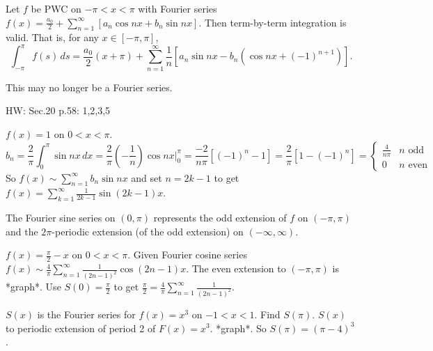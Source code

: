 \documentclass[]{article}
\begin{document}

\begin{theorem}
	Let $f$ be PWC on $-\pi<x<\pi$ with Fourier series $f(x) = \frac{a_0}{2} + \sum_{n=1}^\infty [ a_n\cos{nx} + b_n\sin{nx}]$. Then term-by-term integration is valid. That is, for any $x\in[-\pi,\pi]$, $$\int_{-\pi}^\pi f(s) \, ds = \frac{a_0}{2}(x+\pi) + \sum_{n=1}^\infty \frac{1}{n}\left[ a_n\sin{nx} - b_n\left(\cos{nx} +(-1)^{n+1} \right)\right]. $$
	\begin{note}
		This may no longer be a Fourier series.
	\end{note}
\end{theorem}
HW: Sec.20 p.58: 1,2,3,5
\begin{example}
	$f(x) = 1$ on $0<x<\pi$. $$b_n = \frac{2}{\pi}\int_0^\pi\sin{nx}\, dx = \frac{2}{\pi} \left( -\frac{1}{n} \right) \cos{nx} \bigg\rvert_0^\pi = \frac{-2}{n\pi} \left[ (-1)^n-1 \right] = \frac{2}{\pi} [1-(-1)^n] = \begin{cases} \frac{4}{n\pi} & n \text{ odd} \\ 0 & n \text{ even} \end{cases}$$ So $f(x) \sim \sum_{n=1}^\infty b_n \sin{nx} $ and set $n=2k-1$ to get $f(x) = \sum_{k=1}^\infty \frac{1}{2k-1}\sin{(2k-1)x}$.

	The Fourier sine series on $(0,\pi)$ represents the odd extension of $f$ on $(-\pi,\pi)$ and the $2\pi$-periodic extension (of the odd extension) on $(-\infty,\infty)$.
\end{example}

\begin{example}
	 $f(x) = \frac{\pi}{2} - x$ on $0<x<\pi$. Given Fourier cosine series $f(x) \sim \frac{4}{\pi} \sum_{n=1}^\infty \frac{1}{(2n-1)^2} \cos{(2n-1)x}$. The even extension to $(-\pi,\pi)$ is *graph*.
	Use $S(0)=\frac{\pi}{2}$ to get $\frac{\pi}{2} = \frac{4}{\pi} \sum_{n=1}^\infty \frac{1}{(2n-1)^2}$.
\end{example}
\begin{example}
	 $S(x)$ is the Fourier series for $f(x) = x^3$ on $-1<x<1$. Find $S(\pi)$. $S(x)$  to periodic extension of period 2 of $F(x) = x^3$. *graph*. So $S(\pi) = (\pi-4)^3$.
\end{example}
\end{document}
